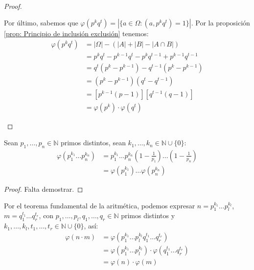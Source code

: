 \begin{proof}
\begin{enumerate}[label=\roman *), font=\normalfont]
		      Por último, sabemos que $\varphi(p^k q^t) = |\{a \in \Omega : (a, p^k q^t) = 1\}|$. Por la proposición \ref{prop: Principio de inclusión exclusión} tenemos:
		      \begin{align*}
			      \varphi(p^k q^t) & = |\Omega| - (|A| + |B| - |A \cap B|)                 \\
			                       & = p^k q^t - p^{k-1}q^t - p^k q^{t-1} + p^{k-1}q^{t-1} \\
			                       & = q^t(p^k - p^{k-1}) - q^{t-1}(p^k - p^{k-1})         \\
			                       & = (p^k - p^{k-1})(q^t - q^{t-1})                      \\
			                       & = [p^{k-1}(p-1)] [q^{t-1}(q-1)]                       \\
			                       & = \varphi(p^k) \cdot \varphi(q^t)
		      \end{align*}

	\end{enumerate}
\end{proof}

\begin{prop}
	Sean $p_1, \dots, p_n \in \mathbb{N}$ primos distintos, sean $k_1, \dots, k_n \in \mathbb{N} \cup \{0\}$:
	\begin{align*}
		\varphi(p_1^{k_1} \dots p_n^{k_n}) & = p_1^{k_1} \dots p_n^{k_n} \left(1 - \frac{1}{p_1}\right) \dots \left(1 - \frac{1}{p_n}\right) \\
		                                   & = \varphi(p_1^{k_1}) \dots \varphi(p_n^{k_n})
	\end{align*}
\end{prop}

\begin{proof}
	Falta demostrar.
\end{proof}


\begin{enefecto}
	Por el teorema fundamental de la aritmética, podemos expresar $n = p_1^{k_1} \dots p_l^{k_l}$, $m = q_1^{t_1} \dots q_r^{t_r}$, con $p_1, \dots, p_l, q_1, \dots, q_r \in \mathbb{N}$ primos distintos y $k_1, \dots, k_l, t_1, \dots, t_r \in \mathbb{N} \cup \{0\}$, así:
	\begin{align*}
		\varphi(n \cdot m) & = \varphi(p_1^{k_1} \dots p_l^{k_l} q_1^{t_1} \dots q_r^{t_r})                \\
		                   & = \varphi(p_1^{k_1} \dots p_l^{k_l}) \cdot \varphi(q_1^{t_1} \dots q_r^{t_r}) \\
		                   & = \varphi(n) \cdot \varphi(m)
	\end{align*}
\end{enefecto}
